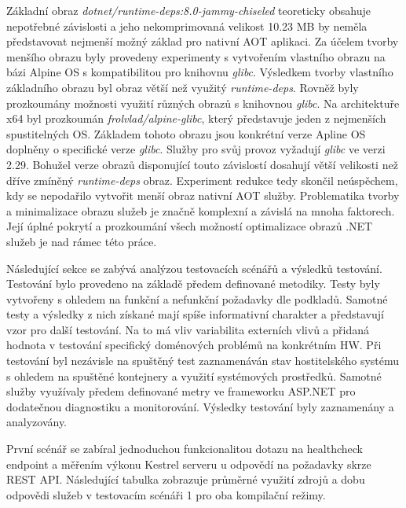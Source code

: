 Základní obraz \emph{dotnet/runtime-deps:8.0-jammy-chiseled} teoreticky obsahuje nepotřebné závislosti a jeho nekomprimovaná velikost 10.23 MB by neměla představovat nejmenší možný základ pro nativní AOT aplikaci. Za účelem tvorby menšího obrazu byly provedeny experimenty s vytvořením vlastního obrazu na bázi Alpine OS s kompatibilitou pro knihovnu \emph{glibc}. Výsledkem tvorby vlastního základního obrazu byl obraz větší než využitý \emph{runtime-deps}. Rovněž byly prozkoumány možnosti využití různých obrazů s knihovnou \emph{glibc}. Na architektuře x64 byl prozkoumán \emph{frolvlad/alpine-glibc}, který představuje jeden z nejmenších spustitelných OS. Základem tohoto obrazu jsou konkrétní verze Apline OS doplněny o specifické verze \emph{glibc}. Služby pro svůj provoz vyžadují \emph{glibc} ve verzi 2.29. Bohužel verze obrazů disponující touto závislostí dosahují větší velikosti než dříve zmíněný \emph{runtime-deps} obraz. Experiment redukce tedy skončil neúspěchem, kdy se nepodařilo vytvořit menší obraz nativní AOT služby. Problematika tvorby a minimalizace obrazu služeb je značně komplexní a závislá na mnoha faktorech. Její úplné pokrytí a prozkoumání všech možností optimalizace obrazů .NET služeb je nad rámec této práce.


Následující sekce se zabývá analýzou testovacích scénářů a výsledků testování. Testování bylo provedeno na základě předem definované metodiky. Testy byly vytvořeny s ohledem na funkční a nefunkční požadavky dle podkladů. Samotné testy a výsledky z nich získané mají spíše informativní charakter a představují vzor pro další testování. Na to má vliv variabilita externích vlivů a přidaná hodnota v testování specifický doménových problémů na konkrétním HW. Při testování byl nezávisle na spuštěný test zaznamenáván stav hostitelského systému s ohledem na spuštěné kontejnery a využití systémových prostředků. Samotné služby využívaly předem definované metry ve frameworku ASP.NET pro dodatečnou diagnostiku a monitorování. Výsledky testování byly zaznamenány a analyzovány.


První scénář se zabíral jednoduchou funkcionalitou dotazu na healthcheck endpoint a měřením výkonu Kestrel serveru u odpovědí na požadavky skrze REST API. Následující tabulka zobrazuje průměrné využití zdrojů a dobu odpovědi služeb v testovacím scénáři 1 pro oba kompilační režimy.

